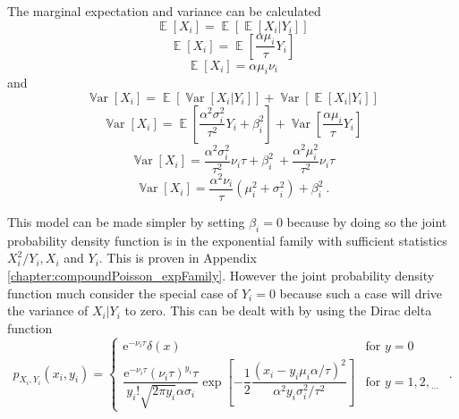 \documentclass[12pt]{report}
\DeclareMathOperator{\expectation}{\mathbb{E}}
\DeclareMathOperator{\variance}{\mathbb{V}ar}
\newcommand{\euler}{\mathrm{e}}
\newcommand{\dotdotdot}{_{\phantom{.}\cdots}}
\begin{document}
The marginal expectation and variance can be calculated
\begin{equation*}
\expectation[X_i]=\expectation[\expectation[X_i|Y_i]]
\end{equation*}
\begin{equation*}
\expectation[X_i]=\expectation\left[\frac{\alpha\mu_i}{\tau}Y_i\right]
\end{equation*}
\begin{equation}
\expectation[X_i] = \alpha \mu_i \nu_i
\end{equation}
and
\begin{equation*}
\variance[X_i] = \expectation[\variance[X_i|Y_i]] + \variance[\expectation[X_i|Y_i]]
\end{equation*}
\begin{equation*}
\variance[X_i] = \expectation\left[\frac{\alpha^2\sigma_i^2}{\tau^2}Y_i+\beta_i^2\right] + \variance\left[\frac{\alpha\mu_i}{\tau}Y_i\right]
\end{equation*}
\begin{equation*}
\variance[X_i] =
\frac{\alpha^2\sigma_i^2}{\tau^2}\nu_i\tau+\beta_i^2\
+\frac{\alpha^2\mu_i^2}{\tau^2}\nu_i\tau
\end{equation*}
\begin{equation}
\variance[X_i] = \frac{\alpha^2\nu_i}{\tau}\left(\mu_i^2+\sigma_i^2\right)+\beta_i^2 \ .
\end{equation}

This model can be made simpler by setting $\beta_i=0$ because by doing so the joint probability density function is in the exponential family with sufficient statistics $X_i^2/Y_i,X_i$ and $Y_i$. This is proven in Appendix \ref{chapter:compoundPoisson_expFamily}. However the joint probability density function much consider the special case of $Y_i=0$ because such a case will drive the variance of $X_i|Y_i$ to zero. This can be dealt with by using the Dirac delta function
\begin{equation}
p_{X_i,Y_i}\left(x_i,y_i\right)=
\begin{cases}
\euler^{-\nu_i\tau}\delta(x) & \text{for }y=0
\\
\dfrac{\euler^{-\nu_i\tau}(\nu_i\tau)^{y_i}\tau}{y_i!\sqrt{2\pi y_i}\alpha\sigma_i}
\exp\left[-\dfrac{1}{2}\dfrac{\left(x_i-y_i\mu_i\alpha/\tau\right)^2}{\alpha^2y_i\sigma_i^2/\tau^2}\right] & \text{for }y=1,2,\dotdotdot
\end{cases} \ .
\end{equation}
\end{document}
